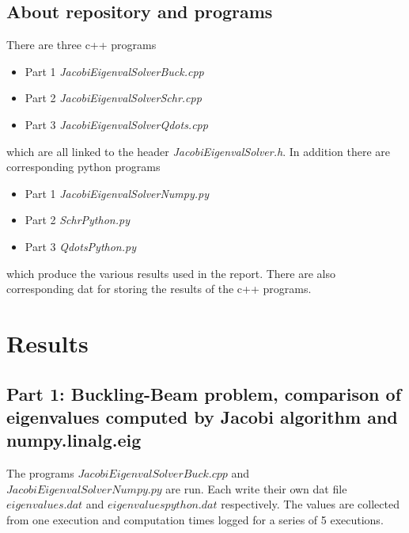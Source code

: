 \documentclass[aip,nobalancelastpage,
twocolumn,
rsi,%
 amsmath,amssymb,
 reprint,%
]{revtex4}
\begin{document}
\subsection{About repository and programs}
There are three c++ programs 
\begin{itemize}
\item Part 1 \textit{JacobiEigenvalSolverBuck.cpp}
\item Part 2 \textit{JacobiEigenvalSolverSchr.cpp}
\item Part 3 \textit{JacobiEigenvalSolverQdots.cpp}
\end{itemize}
which are all linked to the header \textit{JacobiEigenvalSolver.h}. In addition there are corresponding python programs
\begin{itemize}
\item Part 1 \textit{JacobiEigenvalSolverNumpy.py}
\item Part 2 \textit{SchrPython.py}
\item Part 3 \textit{QdotsPython.py}
\end{itemize}
which produce the various results used in the report. There are also corresponding dat for storing the results of the c++ programs.
\section{Results}
\subsection{Part 1: Buckling-Beam problem, comparison of eigenvalues computed by Jacobi algorithm and numpy.linalg.eig}
The programs $JacobiEigenvalSolverBuck.cpp$ and $JacobiEigenvalSolverNumpy.py$ are run. Each write their own dat file $eigenvalues.dat$ and $eigenvaluespython.dat$ respectively. The values are collected from one execution and computation times logged for a series of 5 executions.
\end{document}
